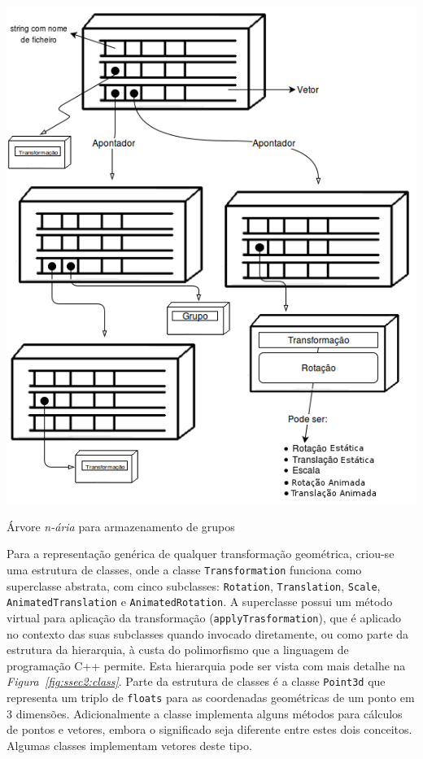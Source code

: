 \begin{center} 	
\includegraphics[width=\textwidth,height=\textheight,keepaspectratio]{resources/estrutura.png}
\captionsetup{type=figure, width=0.8\linewidth}
\caption{Árvore \emph{n-ária} para armazenamento de grupos}
\label{fig:ssec2:strut} 
\end{center}

Para a representação genérica de qualquer transformação geométrica, criou-se uma
estrutura de classes, onde a classe \texttt{Transformation} funciona como
superclasse abstrata, com cinco subclasses: \texttt{Rotation},
\texttt{Translation}, \texttt{Scale}, \texttt{AnimatedTranslation}
e \texttt{AnimatedRotation}. A superclasse possui um método virtual para
aplicação da transformação (\texttt{applyTrasformation}), que é aplicado no
contexto das suas subclasses quando invocado diretamente, ou como parte da
estrutura da hierarquia, à custa do polimorfismo que a linguagem de programação
C++ permite. Esta hierarquia pode ser vista com mais detalhe na
\emph{Figura~\ref{fig:ssec2:class}}. Parte da estrutura de classes é a classe
\texttt{Point3d} que representa um triplo de \texttt{floats} para as
coordenadas geométricas de um ponto em 3 dimensões. Adicionalmente a classe
implementa alguns métodos para cálculos de pontos e vetores, embora
o significado seja diferente entre estes dois conceitos. Algumas classes
implementam vetores deste tipo.

